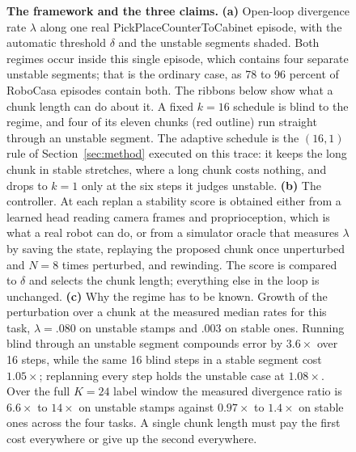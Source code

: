 \begin{figure}[t]
\caption{\textbf{The framework and the three claims.}
\textbf{(a)} Open-loop divergence rate $\lambda$ along one real
PickPlaceCounterToCabinet episode, with the automatic threshold $\delta$ and
the unstable segments shaded. Both regimes occur inside this single episode,
which contains four separate unstable segments; that is the ordinary case, as
78 to 96 percent of RoboCasa episodes contain both. The ribbons below show what
a chunk length can do about it. A fixed $k{=}16$ schedule is blind to the regime, and
four of its eleven chunks (red outline) run straight through an unstable
segment. The adaptive schedule is the $(16,1)$ rule of Section~\ref{sec:method}
executed on this trace: it keeps the long chunk in stable stretches, where a
long chunk costs nothing, and drops to $k{=}1$ only at the six steps it judges
unstable.
\textbf{(b)} The controller. At each replan a stability score is obtained
either from a learned head reading camera frames and proprioception, which is
what a real robot can do, or from a simulator oracle that measures $\lambda$ by
saving the state, replaying the proposed chunk once unperturbed and $N{=}8$
times perturbed, and rewinding. The score is compared to $\delta$ and selects
the chunk length; everything else in the loop is unchanged.
\textbf{(c)} Why the regime has to be known. Growth of the perturbation over a
chunk at the measured median rates for this task, $\lambda{=}.080$ on unstable
stamps and $.003$ on stable ones. Running blind through an unstable segment
compounds error by $3.6\times$ over 16 steps, while the same 16 blind steps in a
stable segment cost $1.05\times$; replanning every step holds the unstable case
at $1.08\times$. Over the full $K{=}24$ label window the measured divergence
ratio is $6.6\times$ to $14\times$ on unstable stamps against $0.97\times$ to
$1.4\times$ on stable ones across the four tasks. A single chunk length must
pay the first cost everywhere or give up the second everywhere.}
\label{fig:framework}
\end{figure}
